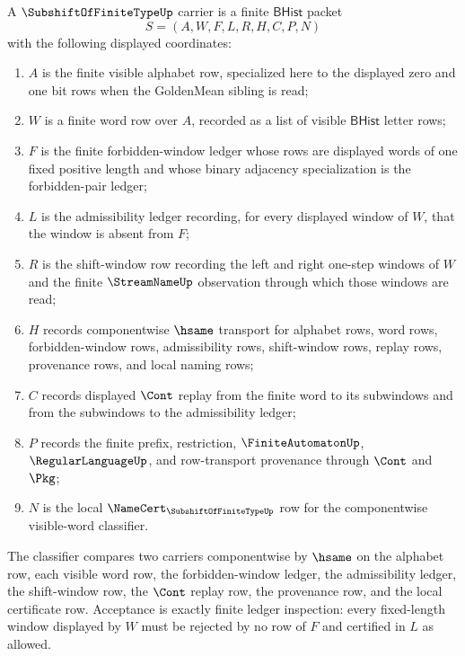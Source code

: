 \begin{definition}
\label{def:subshift-finite-type-carrier}
\label{def:subshift-of-finite-type-carrier}
A $\SubshiftOfFiniteTypeUp$ carrier is a finite $\mathsf{BHist}$ packet
$$
S=(A,W,F,L,R,H,C,P,N)
$$
with the following displayed coordinates:
\begin{enumerate}
\item $A$ is the finite visible alphabet row, specialized here to the displayed zero and one bit rows when the GoldenMean sibling is read;
\item $W$ is a finite word row over $A$, recorded as a list of visible $\mathsf{BHist}$ letter rows;
\item $F$ is the finite forbidden-window ledger whose rows are displayed words of one fixed positive length and whose binary adjacency specialization is the forbidden-pair ledger;
\item $L$ is the admissibility ledger recording, for every displayed window of $W$, that the window is absent from $F$;
\item $R$ is the shift-window row recording the left and right one-step windows of $W$ and the finite $\StreamNameUp$ observation through which those windows are read;
\item $H$ records componentwise $\hsame$ transport for alphabet rows, word rows, forbidden-window rows, admissibility rows, shift-window rows, replay rows, provenance rows, and local naming rows;
\item $C$ records displayed $\Cont$ replay from the finite word to its subwindows and from the subwindows to the admissibility ledger;
\item $P$ records the finite prefix, restriction, $\FiniteAutomatonUp$, $\RegularLanguageUp$, and row-transport provenance through $\Cont$ and $\Pkg$;
\item $N$ is the local $\NameCert_{\SubshiftOfFiniteTypeUp}$ row for the componentwise visible-word classifier.
\end{enumerate}
The classifier compares two carriers componentwise by $\hsame$ on the alphabet row, each visible word row, the forbidden-window ledger, the admissibility ledger, the shift-window row, the $\Cont$ replay row, the provenance row, and the local certificate row. Acceptance is exactly finite ledger inspection: every fixed-length window displayed by $W$ must be rejected by no row of $F$ and certified in $L$ as allowed.
\end{definition}

